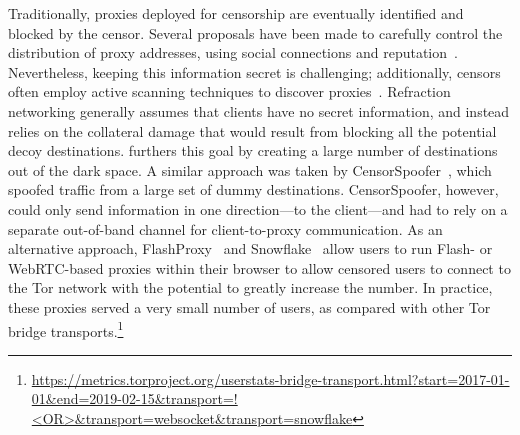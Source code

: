 Traditionally, proxies deployed for censorship are eventually identified and blocked by the censor. Several proposals have been made to carefully control  the distribution of proxy addresses, using social connections and reputation~\cite{proximax,rbridge,salmon}. Nevertheless, keeping this information secret is challenging; additionally, censors often employ active scanning techniques to discover proxies~\cite{Dunna2018a}. Refraction networking generally assumes that clients have no secret information, and instead relies on the  collateral damage that would result from blocking all the potential decoy destinations. \scheme furthers this goal by creating a large number of destinations out of the dark space. A similar approach was taken by CensorSpoofer~\cite{censorspoofer}, which spoofed traffic from a large set of dummy destinations. CensorSpoofer, however, could only send information in one direction---to the client---and had to rely on a separate out-of-band channel for client-to-proxy communication. As an alternative approach, FlashProxy~\cite{flash-proxies} and Snowflake~\cite{snowflake} allow users to run Flash- or WebRTC-based proxies within their browser to allow censored users to connect to the Tor network with the potential to greatly increase the number. In practice, these proxies served a very small number of users, as compared with other Tor bridge transports.\footnote{\url{https://metrics.torproject.org/userstats-bridge-transport.html?start=2017-01-01&end=2019-02-15&transport=!<OR>&transport=websocket&transport=snowflake}}
